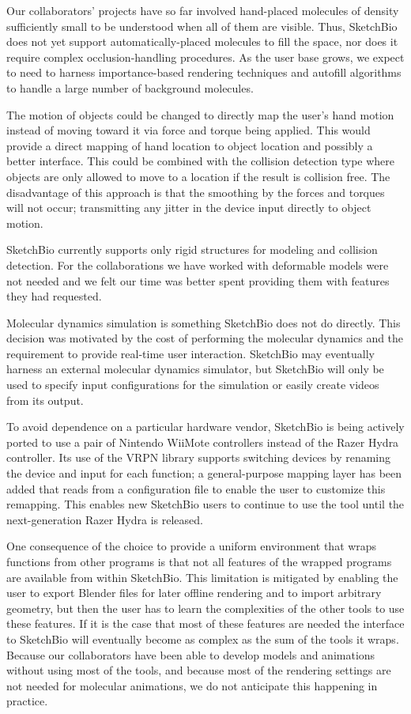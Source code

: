 \documentclass[twocolumn]{bmcart}%
\begin{document}
Our collaborators' projects have so far involved hand-placed molecules of density sufficiently small to be understood when all of them are visible.
Thus, SketchBio does not yet support automatically-placed molecules to fill the space, nor does it require complex occlusion-handling procedures.
As the user base grows, we expect to need to harness importance-based rendering techniques and autofill algorithms to handle a large number of background molecules.

The motion of objects could be changed to directly map the user's hand motion instead of moving toward it via force and torque being applied.
This would provide a direct mapping of hand location to object location and possibly a better interface.
This could be combined with the collision detection type where objects are only allowed to move to a location if the result is collision free.
The disadvantage of this approach is that the smoothing by the forces and torques will not occur; transmitting any jitter in the device input directly to object motion.

SketchBio currently supports only rigid structures for modeling and collision detection.
For the collaborations we have worked with deformable models were not needed and we felt our time was better spent providing them with features they had requested.

Molecular dynamics simulation is something SketchBio does not do directly.
This decision was motivated by the cost of performing the molecular dynamics and the requirement to provide real-time user interaction.
SketchBio may eventually harness an external molecular dynamics simulator, but SketchBio will only be used to specify input configurations for the simulation or easily create videos from its output.

To avoid dependence on a particular hardware vendor, SketchBio is being actively ported to use a pair of Nintendo WiiMote controllers instead of the Razer Hydra controller.
Its use of the VRPN library supports switching devices by renaming the device and input for each function; a general-purpose mapping layer has been added that reads from a configuration file to enable the user to customize this remapping.
This enables new SketchBio users to continue to use the tool until the next-generation Razer Hydra is released.

One consequence of the choice to provide a uniform environment that wraps functions from other programs is that not all features of the wrapped programs are available from within SketchBio. This limitation is mitigated by enabling the user to export Blender files for later offline rendering and to import arbitrary geometry, but then the user has to learn the complexities of the other tools to use these features. If it is the case that most of these features are needed the interface to SketchBio will eventually become as complex as the sum of the tools it wraps. Because our collaborators have been able to develop models and animations without using most of the tools, and because most of the rendering settings are not needed for molecular animations, we do not anticipate this happening in practice.
\end{document}
